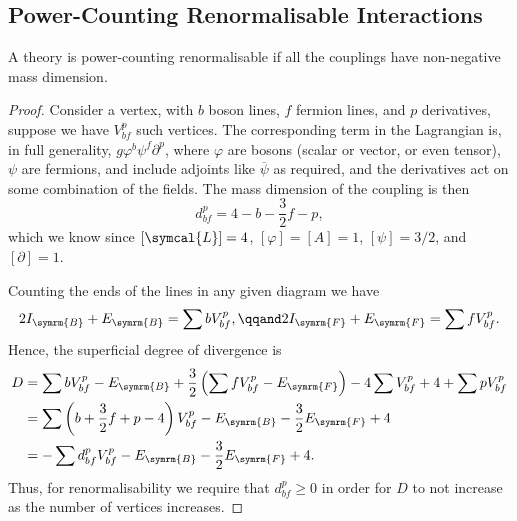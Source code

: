 \documentclass[fleqn]{NotesClass}
\newcommand{\diracadjoint}[1]{\overbar{#1}}
\newcommand{\lagrangianDensity}{\symcal{L}}
\begin{document}
    \subsection{Power-Counting Renormalisable Interactions}
    \begin{thm}{}{}
        A theory is power-counting renormalisable if all the couplings have non-negative mass dimension.
        \begin{proof}
            Consider a vertex, with \(b\) boson lines, \(f\) fermion lines, and \(p\) derivatives, suppose we have \(V_{bf}^p\) such vertices.
            The corresponding term in the Lagrangian is, in full generality, \(g \varphi^b \psi^f \partial^p\), where \(\varphi\) are bosons (scalar or vector, or even tensor), \(\psi\) are fermions, and include adjoints like \(\diracadjoint{\psi}\) as required, and the derivatives act on some combination of the fields.
            The mass dimension of the coupling is then 
            \begin{equation}
                d_{bf}^p = 4 - b - \frac{3}{2}f - p,
            \end{equation}
            which we know since \([\lagrangianDensity] = 4\), \([\varphi] = [A] = 1\), \([\psi] = 3/2\), and \([\partial] = 1\).
            
            Counting the ends of the lines in any given diagram we have
            \begin{equation}
                2I_{\symrm{B}} + E_{\symrm{B}} = \sum b V_{bf}^{p}, \qqand 2I_{\symrm{F}} + E_{\symrm{F}} = \sum f V_{bf}^p.
            \end{equation}
            Hence, the superficial degree of divergence is
            \begin{align}
                D &= \sum bV_{bf}^p - E_{\symrm{B}} + \frac{3}{2}\left( \sum fV_{bf}^p - E_{\symrm{F}} \right) - 4\sum V_{bf}^p + 4 + \sum pV_{bf}^p\\
                &= \sum\left( b + \frac{3}{2}f + p - 4 \right)V_{bf}^p - E_{\symrm{B}} - \frac{3}{2}E_{\symrm{F}} + 4\\
                &= -\sum d_{bf}^p V_{bf}^p - E_{\symrm{B}} - \frac{3}{2}E_{\symrm{F}} + 4.
            \end{align}
            Thus, for renormalisability we require that \(d_{bf}^p \ge 0\) in order for \(D\) to not increase as the number of vertices increases.
        \end{proof}
    \end{thm}
    
\end{document}
